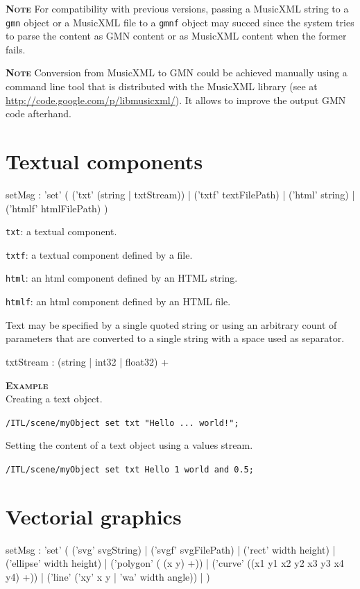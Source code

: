 \documentclass[a4paper,twoside]{report}
\newcommand{\sublevel}[1]	{\section{#1}}
\newcommand{\OSC}[1]		{\texttt{#1}}
\newcommand{\example}		{\textbf{\hspace{-1.5cm}\textbf{\textsc{Example }}}}
\newcommand{\note}	[1]		{\vspace{2mm}\textbf{\hspace{-1.03cm}\textbf{\textsc{Note #1}}}}
\let\olditemize\itemize
\let\oldenditemize\enditemize
\renewenvironment{itemize} 	{\olditemize \setlength{\itemsep}{1mm}}{\oldenditemize}
\newcommand{\sample}	[1]			{\vspace{-2mm}\begin{center}\colorbox{mygrey}{
								\begin{minipage}[t]{0.9\columnwidth} 
								{\small \texttt{#1}}
								\end{minipage}}\end{center}}
\begin{document}
\note{} For compatibility with previous versions, passing a MusicXML string to a \OSC{gmn} object or a MusicXML file to a \OSC{gmnf} object may succed since the system tries to parse the content as GMN content or as MusicXML content when the former fails.

\note{} Conversion from MusicXML to GMN could be achieved manually using a command line tool that is distributed with the MusicXML library (see at \url{http://code.google.com/p/libmusicxml/}). It allows to improve the output GMN code afterhand.

\sublevel{Textual components}
\label{textscore}

\begin{rail}
setMsg : 'set' (
	('txt' (string | txtStream)) |
	('txtf' textFilePath) |
	('html' string) |
	('htmlf' htmlFilePath)
)
\end{rail}

\begin{itemize}
\item \OSC{txt}: a textual component.
\item \OSC{txtf}: a textual component defined by a file.
\item \OSC{html}: an html component defined by an HTML string.
\item \OSC{htmlf}: an html component defined by an HTML file.
\end{itemize}

Text may be specified by a single quoted string or using an arbitrary count of parameters that are converted to a single string with a space used as separator.
\begin{rail}
txtStream :  (string | int32 | float32) +
\end{rail}

\example \\
Creating a text object.
\sample{/ITL/scene/myObject set txt "Hello ...    world!";}
Setting the content of a text object using a values stream.
\sample{/ITL/scene/myObject set txt Hello 1 world and 0.5; }


\sublevel{Vectorial graphics}
\label{vgraphscore}
\begin{rail}
setMsg : 'set' (
	('svg' svgString) |
	('svgf' svgFilePath) |
	('rect' width height) |
	('ellipse' width height) |
	('polygon' ( (x y) +)) |
	('curve' ((x1 y1 x2 y2 x3 y3 x4 y4) +)) |
	('line' ('xy' x y | 'wa' width angle)) |
)
\end{rail}
\end{document}
